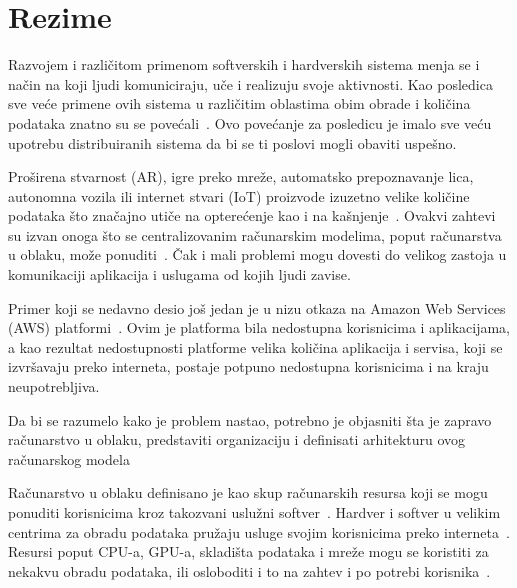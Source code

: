 \chapter*{Rezime}
\pagestyle{plain}

Razvojem i razli\v citom primenom softverskih i hardverskih sistema menja se i na\v cin na koji ljudi komuniciraju, u\v ce i realizuju svoje aktivnosti. Kao posledica sve ve\'ce primene ovih sistema u razli\v citim oblastima obim obrade i koli\v cina podataka znatno su se pove\'cali~\cite{ChiangZ16}. Ovo pove\'canje za posledicu je imalo sve ve\'cu upotrebu distribuiranih sistema da bi se ti poslovi mogli obaviti uspe\v sno.

Pro\v sirena stvarnost (AR), igre preko mre\v ze, automatsko prepoznavanje lica, autonomna vozila ili internet stvari (IoT) proizvode izuzetno velike koli\v cine podataka \v sto zna\v cajno uti\v ce na opterećenje kao i na ka\v snjenje~\cite{ChiangZ16}. Ovakvi zahtevi su izvan onoga \v sto se centralizovanim ra\v cunarskim modelima, poput ra\v cunarstva u oblaku, mo\v ze ponuditi~\cite{ChiangZ16}. \v Cak i mali problemi mogu dovesti do velikog zastoja u komunikaciji aplikacija i uslugama od kojih ljudi zavise.  

Primer koji se nedavno desio jo\v s jedan je u nizu otkaza na Amazon Web Services (AWS) platformi~\cite{GunawiHSLSAE16}. Ovim je platforma bila nedostupna korisnicima i aplikacijama, a kao rezultat nedostupnosti platforme velika koli\v cina aplikacija i servisa, koji se izvr\v savaju preko interneta, postaje potpuno nedostupna korisnicima i na kraju neupotrebljiva. 


Da bi se razumelo kako je problem nastao, potrebno je objasniti \v sta je zapravo ra\v cunarstvo u oblaku, predstaviti organizaciju i definisati arhitekturu ovog ra\v cunarskog modela

Ra\v cunarstvo u oblaku definisano je kao skup ra\v cunarskih resursa koji se mogu ponuditi korisnicima kroz takozvani uslu\v zni softver~\cite{Vogels}. Hardver i softver u velikim centrima za obradu podataka pru\v zaju usluge svojim korisnicima preko interneta~\cite {AboveTheCloud}. Resursi poput CPU-a, GPU-a, skladi\v sta podataka i mre\v ze mogu se koristiti za nekakvu obradu podataka, ili osloboditi i to na zahtev i po potrebi korisnika~\cite{ZhangCB10}. 

